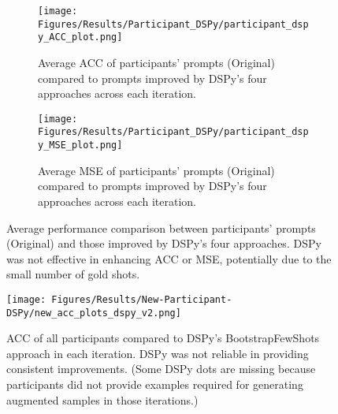 \begin{figure*}[t]
    \centering
    \begin{subfigure}{0.48\textwidth}
        \texttt{[image: Figures/Results/Participant\_DSPy/participant\_dspy\_ACC\_plot.png]}
        \caption{Average ACC of participants' prompts (Original) compared to prompts improved by DSPy's four approaches across each iteration.}
        \label{fig:dspy-plot-acc}
    \end{subfigure}
    \hfill
    \begin{subfigure}{0.48\textwidth}
        \texttt{[image: Figures/Results/Participant\_DSPy/participant\_dspy\_MSE\_plot.png]}
        \caption{Average MSE of participants' prompts (Original) compared to prompts improved by DSPy's four approaches across each iteration.}
        \label{fig:dspy-plot-mse}
    \end{subfigure}
    
    \caption{Average performance comparison between participants' prompts (Original) and those improved by DSPy's four approaches. DSPy was not effective in enhancing ACC or MSE, potentially due to the small number of gold shots.}
    \label{fig:dspy-four-settings-charts}
\end{figure*}

\begin{figure*}[t]
    \centering
    \texttt{[image: Figures/Results/New-Participant-DSPy/new\_acc\_plots\_dspy\_v2.png]}
    \caption{ACC of all participants compared to DSPy's BootstrapFewShots approach in each iteration. DSPy was not reliable in providing consistent improvements. (Some DSPy dots are missing because participants did not provide examples required for generating augmented samples in those iterations.)}
    \label{fig:acc-participant-plus-dspy}
\end{figure*}


